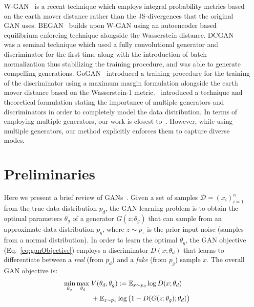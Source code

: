 W-GAN~\cite{arjovsky2017wasserstein} is a recent technique which employs integral probability metrics based on the earth mover distance rather than the JS-divergences that the original GAN uses. BEGAN~\cite{berthelot2017began} builds upon W-GAN using an autoencoder based equilibrium enforcing technique alongside the Wasserstein distance. DCGAN~\cite{radford2015unsupervised} was a seminal technique which used a fully convolutional generator and discriminator for the first time along with the introduction of batch normalization thus stabilizing the training procedure, and was able to generate compelling generations. GoGAN~\cite{juefei2017gang} introduced a training procedure for the training of the discriminator using a maximum margin formulation alongside the earth mover distance based on the Wasserstein-1 metric.~\cite{arora2017generalization} introduced a technique and theoretical formulation stating the importance of multiple generators and discriminators in order to completely model the data distribution. In terms of employing multiple generators, our work is closest to~\cite{arora2017generalization,liu2016coupled,ghosh2016message}. However, while using multiple generators, our method explicitly enforces them to capture diverse modes. 

\section{Preliminaries}
Here we present a brief review of GANs~\cite{goodfellow2014generative}. Given a set of samples $\mathcal{D} = (x_i)_{i=1}^n$ from the true data distribution $p_d$, the GAN learning problem is to obtain the optimal parameters $\theta_g$ of a generator $G(z;\theta_g)$ that can sample from an approximate data distribution $p_g$, where $z \sim p_z$ is the prior input noise (\eg samples from a normal distribution). In order to learn the optimal $\theta_g$, the GAN objective (Eq.~\eqref{eq:ganObjective}) employs a discriminator $D(x; \theta_d)$ that learns to differentiate between a {\em real} (from $p_d$) and a {\em fake} (from $p_g$) sample $x$. The overall GAN objective is:
\begin{align}
	\label{eq:ganObjective}
	\min_{\theta_g}\max_{\theta_d}\; & V(\theta_d, \theta_g) := \operatorname{\mathbb{E}}_{x \sim p_{d}} \log D(x; \theta_d) \nonumber \\&
	+ \operatorname{\mathbb{E}}_{z \sim p_z } \log \big( 1 - D(G(z; \theta_g) ; \theta_d)\big) 
\end{align}


